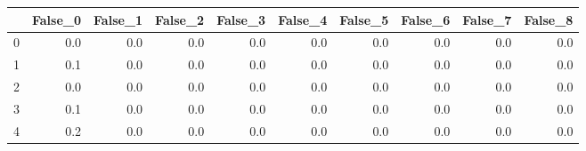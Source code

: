\begin{tabular}{lrrrrrrrrr}
\toprule
{} &  False\_0 &  False\_1 &  False\_2 &  False\_3 &  False\_4 &  False\_5 &  False\_6 &  False\_7 &  False\_8 \\ \hline
\midrule
0 &      0.0 &      0.0 &      0.0 &      0.0 &      0.0 &      0.0 &      0.0 &      0.0 &      0.0 \\ \hline
1 &      0.1 &      0.0 &      0.0 &      0.0 &      0.0 &      0.0 &      0.0 &      0.0 &      0.0 \\ \hline
2 &      0.0 &      0.0 &      0.0 &      0.0 &      0.0 &      0.0 &      0.0 &      0.0 &      0.0 \\ \hline
3 &      0.1 &      0.0 &      0.0 &      0.0 &      0.0 &      0.0 &      0.0 &      0.0 &      0.0 \\ \hline
4 &      0.2 &      0.0 &      0.0 &      0.0 &      0.0 &      0.0 &      0.0 &      0.0 &      0.0 \\ \hline
\bottomrule
\end{tabular}
